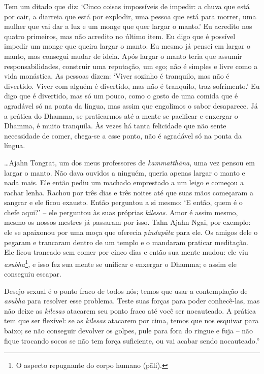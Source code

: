 Tem um ditado que diz: `Cinco coisas impossíveis de impedir: a chuva que
está por cair, a diarreia que está por explodir, uma pessoa que está
para morrer, uma mulher que vai dar a luz e um monge que quer largar o
manto.' Eu acredito nos quatro primeiros, mas não acredito no último
item. Eu digo que é possível impedir um monge que queira largar o manto.
Eu mesmo já pensei em largar o manto, mas consegui mudar de ideia. Após
largar o manto teria que assumir responsabilidades, construir uma
reputação, um ego; não é simples e livre como a vida monástica. As
pessoas dizem: `Viver sozinho é tranquilo, mas não é divertido. Viver
com alguém é divertido, mas não é tranquilo, traz sofrimento.' Eu digo
que é divertido, mas só um pouco, como o gosto de uma comida que é
agradável só na ponta da língua, mas assim que engolimos o sabor
desaparece. Já a prática do Dhamma, se praticarmos até a mente se
pacificar e enxergar o Dhamma, é muito tranquila. Às vezes há tanta
felicidade que não sente necessidade de comer, chega-se a esse ponto,
não é agradável só na ponta da língua.

\ldots{}Ajahn Tongrat, um dos meus professores de \emph{kammatthāna},
uma vez pensou em largar o manto. Não dava ouvidos a ninguém, queria
apenas largar o manto e nada mais. Ele então pediu um machado emprestado
a um leigo e começou a rachar lenha. Rachou por três dias e três noites
até que suas mãos começaram a sangrar e ele ficou exausto. Então
perguntou a si mesmo: `E então, quem é o chefe aqui?' -- ele perguntou
às suas próprias \emph{kilesas}. Amor é assim mesmo, mesmo os nossos
mestres já passaram por isso. Tahn Ajahn Ngai, por exemplo: ele se
apaixonou por uma moça que oferecia \emph{pindapāta} para ele. Os amigos
dele o pegaram e trancaram dentro de um templo e o mandaram praticar
meditação. Ele ficou trancado sem comer por cinco dias e então sua mente
mudou: ele viu \emph{asubha}\footnote{O aspecto repugnante do corpo
  humano (pāli).}\emph{,} e isso fez sua mente se unificar e enxergar o
Dhamma; e assim ele conseguiu escapar.

Desejo sexual é o ponto fraco de todos nós; temos que usar a
contemplação de \emph{asubha} para resolver esse problema. Teste suas
forças para poder conhecê-las, mas não deixe as \emph{kilesas} atacarem
seu ponto fraco até você ser nocauteado. A prática tem que ser flexível:
se as \emph{kilesas} atacarem por cima, temos que nos esquivar para
baixo; se não conseguir devolver os golpes, pule para fora do ringue e
fuja -- não fique trocando socos se não tem força suficiente, ou vai
acabar sendo nocauteado.''

